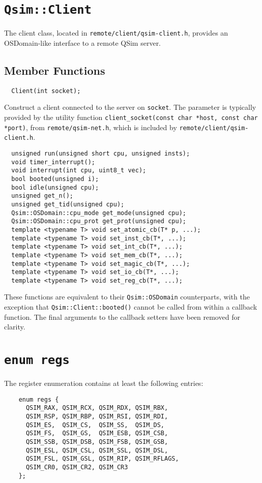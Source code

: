 \documentclass[letterpaper, 10pt]{book}
\begin{document}
\section{\texttt{Qsim::Client}} \label{class:Client}
The client class, located in \texttt{remote/client/qsim-client.h}, provides an
OSDomain-like interface to a remote QSim server.

\subsection{Member Functions}

\label{func:Client}
\begin{verbatim}
  Client(int socket);
\end{verbatim}
Construct a client connected to the server on \texttt{socket}. The parameter is
typically provided by the utility function
\texttt{client\_socket(const char *host, const char *port)}, from
\texttt{remote/qsim-net.h}, which is included by
\texttt{remote/client/qsim-client.h}.

\begin{verbatim}
  unsigned run(unsigned short cpu, unsigned insts);
  void timer_interrupt();
  void interrupt(int cpu, uint8_t vec);
  bool booted(unsigned i);
  bool idle(unsigned cpu);
  unsigned get_n();
  unsigned get_tid(unsigned cpu);
  Qsim::OSDomain::cpu_mode get_mode(unsigned cpu);
  Qsim::OSDomain::cpu_prot get_prot(unsigned cpu);
  template <typename T> void set_atomic_cb(T* p, ...);
  template <typename T> void set_inst_cb(T*, ...);
  template <typename T> void set_int_cb(T*, ...);
  template <typename T> void set_mem_cb(T*, ...);
  template <typename T> void set_magic_cb(T*, ...);
  template <typename T> void set_io_cb(T*, ...);
  template <typename T> void set_reg_cb(T*, ...);

\end{verbatim}
These functions are equivalent to their \texttt{Qsim::OSDomain} counterparts,
with the exception that \texttt{Qsim::Client::booted()} cannot be called from
within a callback function. The final arguments to the callback setters have
been removed for clarity.

\newpage

\section{\texttt{enum regs}} \label{enum:regs}
The register enumeration contains at least the following entries:

\begin{verbatim}
    enum regs {
      QSIM_RAX, QSIM_RCX, QSIM_RDX, QSIM_RBX,
      QSIM_RSP, QSIM_RBP, QSIM_RSI, QSIM_RDI,
      QSIM_ES,  QSIM_CS,  QSIM_SS,  QSIM_DS,
      QSIM_FS,  QSIM_GS,  QSIM_ESB, QSIM_CSB,
      QSIM_SSB, QSIM_DSB, QSIM_FSB, QSIM_GSB,
      QSIM_ESL, QSIM_CSL, QSIM_SSL, QSIM_DSL,
      QSIM_FSL, QSIM_GSL, QSIM_RIP, QSIM_RFLAGS,
      QSIM_CR0, QSIM_CR2, QSIM_CR3
    };
\end{verbatim}
\end{document}
